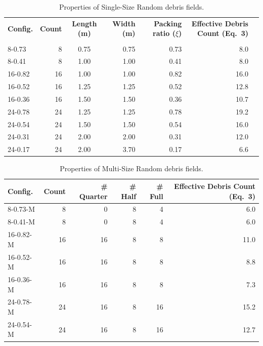 \documentclass[10pt,a4paper]{article}
\begin{document}
\begin{table}[h!]
\centering
\caption{Properties of Single-Size Random debris fields.}
\small
\begin{tabular}{l r c r r r r}
\hline
\textbf{Config.} & \textbf{Count} & \textbf{Length (m)} & \textbf{Width (m)} & \textbf{Packing ratio ($\xi$)} & \textbf{Effective Debris Count (Eq.~3)} \\\\
\hline
8-0.73 & 8   & 0.75 & 0.75 & 0.73 & 8.0 \\
8-0.41 & 8   & 1.00 & 1.00 & 0.41 & 8.0 \\
16-0.82 & 16 & 1.00 & 1.00 & 0.82 & 16.0\\
16-0.52 & 16 & 1.25 & 1.25 & 0.52 & 12.8\\
16-0.36 & 16 & 1.50 & 1.50 & 0.36 & 10.7\\
24-0.78 & 24 & 1.25 & 1.25 & 0.78 & 19.2\\
24-0.54 & 24 & 1.50 & 1.50 & 0.54 & 16.0\\
24-0.31 & 24 & 2.00 & 2.00 & 0.31 & 12.0\\
24-0.17 & 24 & 2.00 & 3.70 & 0.17 & 6.6\\
\hline
\end{tabular}
\label{tab:random-debris-single}
\end{table}


\begin{table}[h!]
\centering
\caption{Properties of Multi-Size Random debris fields.}
{\small
\begin{tabular}{l r r r r r}
\hline
\textbf{Config.} 
& \textbf{Count } 
& \textbf{\# Quarter} 
& \textbf{\# Half} 
& \textbf{\# Full} 
& \textbf{Effective Debris Count (Eq.~3)} \\
\hline
8-0.73-M  & 8   & 0  & 8  & 4 & 6.0 \\
8-0.41-M  & 8   & 0  & 8  & 4 & 6.0\\
16-0.82-M & 16  & 16 & 8  & 8 & 11.0\\
16-0.52-M & 16   & 16 & 8  & 8 & 8.8 \\
16-0.36-M & 16   & 16 & 8  & 8 & 7.3 \\
24-0.78-M & 24  & 16 & 8  & 16 & 15.2 \\
24-0.54-M & 24  & 16 & 8  & 16 & 12.7\\
\hline
\end{tabular}
}
\label{tab:multi_size_configs}
\end{table}
\end{document}
